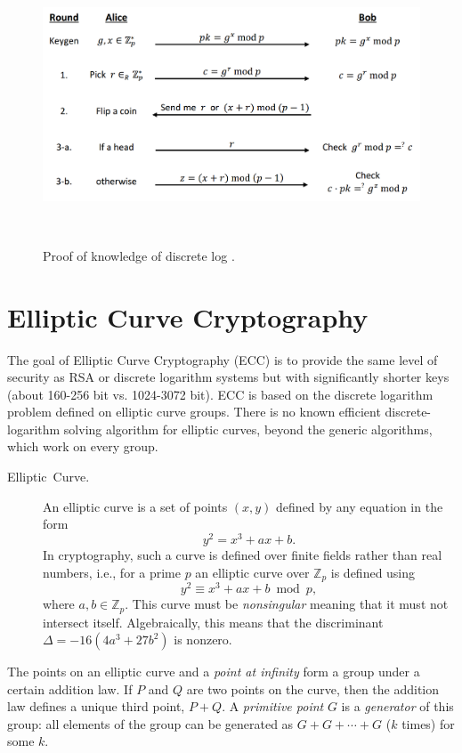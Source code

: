\documentclass[10pt]{article}
\theoremstyle{plain}
\begin{document}
\begin{figure}
	\begin{description}
		\item [{\includegraphics[scale=0.5]{cev-zkp}}]~
	\end{description}
	\caption{Proof of knowledge of discrete log \cite{Chaum:87:ZKP}.}
	\label{fig:CEG-ZKP}
\end{figure}


\section{Elliptic Curve Cryptography}

The goal of Elliptic Curve Cryptography (ECC) is to provide the same
level of security as RSA or discrete logarithm systems but with significantly
shorter keys (about 160-256 bit vs. 1024-3072 bit). ECC is based on
the discrete logarithm problem defined on elliptic curve groups. There
is no known efficient discrete-logarithm solving algorithm for elliptic
curves, beyond the generic algorithms, which work on every group.
\begin{description}
	\item [{Elliptic~Curve.}] An elliptic curve is a set of points $(x,y)$
	defined by any equation in the form 
	\[
	y^{2}=x^{3}+ax+b.
	\]
	In cryptography, such a curve is defined over finite fields rather
	than real numbers, i.e., for a prime $p$ an elliptic curve over $\mathbb{Z}_{p}$
	is defined using 
	\[
	y^{2}\equiv x^{3}+ax+b\bmod{p},
	\]
	where $a,b\in\mathbb{Z}_{p}$. This curve must be \emph{nonsingular}
	meaning that it must not intersect itself. Algebraically, this means
	that the discriminant $\Delta=-16(4a^{3}+27b^{2})$ is nonzero.
\end{description}
The points on an elliptic curve and a \emph{point at infinity} form
a group under a certain addition law. If $P$ and $Q$ are two points
on the curve, then the addition law defines a unique third point,
$P+Q$. A \emph{primitive point} $G$ is a \emph{generator} of this
group: all elements of the group can be generated as $G+G+\cdots+G$
($k$ times) for some $k$.
\end{document}
